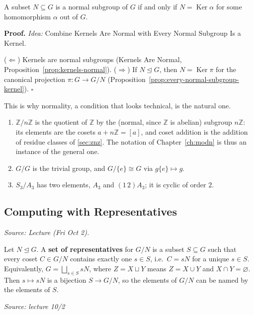 \documentclass[11pt]{report}
\renewenvironment{proof}[1][Proof]{\noindent\textbf{#1.} }{\hfill$\square$\par\vspace{5pt}}
\newcommand{\srcline}[1]{\par\hfill{\footnotesize\textit{Source: #1}}}
\begin{document}
\begin{corbox}\label{cor:quotient-normal-subgroups-exactly-kernels}
A subset $N \subseteq G$ is a normal subgroup of $G$ if and only if $N = \operatorname{Ker}\alpha$ for some homomorphism $\alpha$ out of $G$.
\end{corbox}

\begin{proof}
\textit{Idea:} Combine Kernels Are Normal with Every Normal Subgroup Is a Kernel.\par
($\Leftarrow$) Kernels are normal subgroups (Kernels Are Normal, Proposition~\ref{prop:kernels-normal}). ($\Rightarrow$) If $N \trianglelefteq G$, then $N = \operatorname{Ker}\pi$ for the canonical projection $\pi: G \to G/N$ (Proposition~\ref{prop:every-normal-subgroup-kernel}).
\end{proof}

This is why normality, a condition that looks technical, is the natural one.

\begin{exbox}\label{ex:quotient-groups}
\begin{enumerate}[nosep]
    \item $\mathbb{Z}/n\mathbb{Z}$ is the quotient of $\mathbb{Z}$ by the (normal, since $\mathbb{Z}$ is abelian) subgroup $n\mathbb{Z}$: its elements are the cosets $a + n\mathbb{Z} = [a]$, and coset addition is the addition of residue classes of \ref{sec:znz}. The notation of Chapter~\ref{ch:modn} is thus an instance of the general one.
    \item $G/G$ is the trivial group, and $G/\{e\} \cong G$ via $g\{e\} \mapsto g$.
    \item $S_3/A_3$ has two elements, $A_3$ and $(1\,2)A_3$; it is cyclic of order $2$.
\end{enumerate}
\end{exbox}

\subsection{Computing with Representatives}\label{sec:representatives}

\textit{Source: Lecture (Fri Oct 2).}

\begin{defbox}\label{def:set-representatives}
Let $N \trianglelefteq G$. A \textbf{set of representatives} for $G/N$ is a subset $S \subseteq G$ such that every coset $C \in G/N$ contains exactly one $s \in S$, i.e.\ $C = sN$ for a unique $s \in S$. Equivalently, $G = \bigsqcup_{s \in S} sN$, where $Z = X \sqcup Y$ means $Z = X \cup Y$ and $X \cap Y = \varnothing$. Then $s \mapsto sN$ is a bijection $S \to G/N$, so the elements of $G/N$ can be named by the elements of $S$.
\srcline{lecture 10/2}
\end{defbox}
\end{document}
